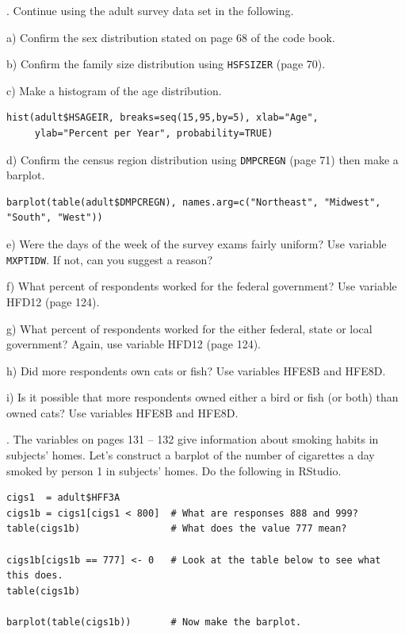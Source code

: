 \documentclass[10pt]{article}
\newcounter{EX}\setcounter{EX}{1}
\newcommand{\EXERCISE}{\arabic{EX}.\stepcounter{EX} }
\begin{document}
\EXERCISE Continue using the adult survey data set in the following.

\hspace{10pt} a) Confirm the sex distribution stated on page 68 of the code book.

\hspace{10pt} b) Confirm the family size distribution using \texttt{HSFSIZER} (page 70).

\hspace{10pt} c) 
 Make a histogram of the age distribution.\vspace{-6pt}
\begin{verbatim}
hist(adult$HSAGEIR, breaks=seq(15,95,by=5), xlab="Age", 
     ylab="Percent per Year", probability=TRUE)
\end{verbatim}\vspace{-4pt}

\hspace{10pt} d) Confirm the census region distribution using \texttt{DMPCREGN} (page 71)
then make a barplot.\vspace{-6pt}
\begin{verbatim}
barplot(table(adult$DMPCREGN), names.arg=c("Northeast", "Midwest", "South", "West"))
\end{verbatim}\vspace{-4pt}

\hspace{10pt} e) Were the days of the week of the survey exams fairly uniform?
Use variable \texttt{MXPTIDW}.  If not, can you suggest a reason?

\hspace{10pt} f) What percent of respondents worked for the federal government?
Use variable HFD12 (page 124).  

\hspace{10pt} g) What percent of respondents worked for the either federal, state or local
 government?
Again, use variable HFD12 (page 124).  

\hspace{10pt} h) Did more respondents own cats or fish?  Use variables HFE8B and HFE8D.

\hspace{10pt} i) Is it possible that  more respondents owned either a bird or fish 
(or both) than  owned cats?  Use variables HFE8B and HFE8D.
\medskip

\EXERCISE  The variables on pages 131 -- 132 give information about smoking habits in 
 subjects' homes.  Let's construct a barplot of the number of cigarettes a day
smoked by person 1 in subjects' homes.  Do the following in RStudio.
\begin{verbatim}
cigs1  = adult$HFF3A
cigs1b = cigs1[cigs1 < 800]  # What are responses 888 and 999?
table(cigs1b)                # What does the value 777 mean?

cigs1b[cigs1b == 777] <- 0   # Look at the table below to see what this does.
table(cigs1b)

barplot(table(cigs1b))       # Now make the barplot.
\end{verbatim}
\vfill
\eject
\end{document}
